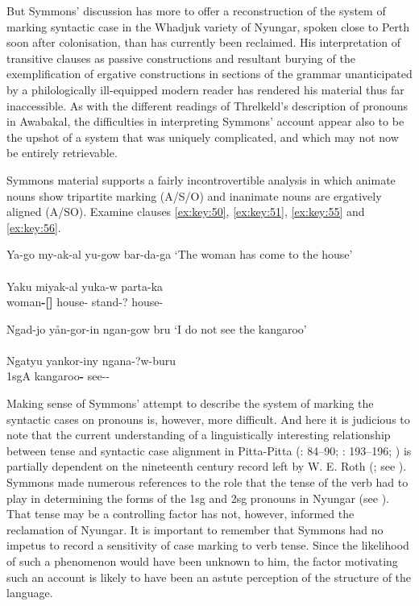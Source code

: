 But Symmons' discussion has more to offer a reconstruction of the system of marking syntactic case in the Whadjuk variety of Nyungar, spoken close to Perth soon after colonisation, than has currently been reclaimed. His interpretation of transitive clauses as passive constructions and resultant burying of the exemplification of ergative constructions in sections of the grammar unanticipated by a philologically ill-equipped modern reader has rendered his material thus far inaccessible. As with the different readings of Threlkeld’s description of pronouns in Awabakal, the difficulties in interpreting Symmons' account appear also to be the upshot of a system that was uniquely complicated, and which may not now be entirely retrievable.

Symmons material supports a fairly incontrovertible analysis in which animate nouns show tripartite marking (A/S/O) and inanimate nouns are ergatively aligned (A/SO). Examine clauses \ref{ex:key:50}, \ref{ex:key:51}, \ref{ex:key:55} and \ref{ex:key:56}.

\newpage
\ea\label{bkm:Ref516554518}\label{ex:key:55}
	Ya-go         my-ak-al        yu-gow                 bar-da-ga
	\glt `The woman has come to the house' \\
	\citep{symmons_grammatical_1841} \\
	\gll Yaku            miyak-al          yuka-w              parta-ka\\
	woman\textbf{{}-[]} house- stand-?      house-\\
\z

\ea\label{bkm:Ref516554630}\label{ex:key:56}
	Ngad-jo         yån-gor-in                   ngan-gow bru
	\glt `I do not see the kangaroo' \\
	\citep{symmons_grammatical_1841} \\
	\gll Ngatyu                 yankor-iny          ngana-?w-buru\\
	1sgA        kangaroo\textbf{{}-}          see--\\
\z

Making sense of Symmons' attempt to describe the system of marking the syntactic cases on pronouns is, however, more difficult. And here it is judicious to note that the current understanding of a linguistically interesting relationship between tense and syntactic case alignment in Pitta-Pitta (\citealt{blake_pitta-pitta_1971}: 84--90; \citealt{blake_australian_1979}: 193--196; ) is partially dependent on the nineteenth century record left by W. E. Roth (\citealt{roth_ethnological_1897}; see \citealt[135--136]{breen_we_2008}). Symmons made numerous references to the role that the tense of the verb had to play in determining the forms of the 1sg and 2sg pronouns in Nyungar (see \citealt{Stockigt2017}). That tense may be a controlling factor has not, however, informed the reclamation of Nyungar. It is important to remember that Symmons had no impetus to record a sensitivity of case marking to verb tense. Since the likelihood of such a phenomenon would have been unknown to him, the factor motivating such an account is likely to have been an astute perception of the structure of the language.

